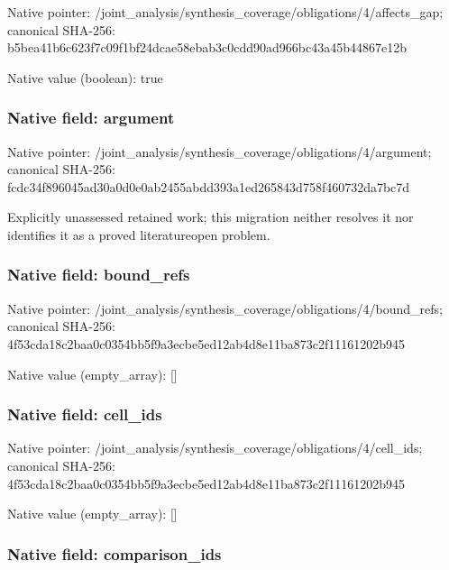 \documentclass[10pt,a4paper]{article}
\begin{document}
Native pointer: /joint\_analysis/synthesi\allowbreak{}s\_coverage/obligations/4\allowbreak{}/affects\_gap; canonical SHA-256: b5bea41b6c623f7c09f1bf24\allowbreak{}dcae58ebab3c0cdd90ad966b\allowbreak{}c43a45b44867e12b



Native value (boolean): true



\subsubsection{Native field: argument}


Native pointer: /joint\_analysis/synthesi\allowbreak{}s\_coverage/obligations/4\allowbreak{}/argument; canonical SHA-256: fcdc34f896045ad30a0d0e0a\allowbreak{}b2455abdd393a1ed265843d7\allowbreak{}58f460732da7bc7d


Explicitly unassessed retained work; this migration neither resolves it nor identifies it as a proved literatureopen problem.


\subsubsection{Native field: bound\_refs}


Native pointer: /joint\_analysis/synthesi\allowbreak{}s\_coverage/obligations/4\allowbreak{}/bound\_refs; canonical SHA-256: 4f53cda18c2baa0c0354bb5f\allowbreak{}9a3ecbe5ed12ab4d8e11ba87\allowbreak{}3c2f11161202b945



Native value (empty\_array): []



\subsubsection{Native field: cell\_ids}


Native pointer: /joint\_analysis/synthesi\allowbreak{}s\_coverage/obligations/4\allowbreak{}/cell\_ids; canonical SHA-256: 4f53cda18c2baa0c0354bb5f\allowbreak{}9a3ecbe5ed12ab4d8e11ba87\allowbreak{}3c2f11161202b945



Native value (empty\_array): []



\subsubsection{Native field: comparison\_ids}
\end{document}
